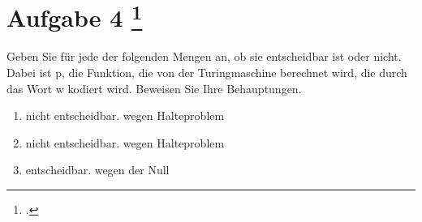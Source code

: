 \documentclass{lehramt-informatik-aufgabe}
\begin{document}
\liAufgabenTitel{}
\section{Aufgabe 4
\footcite{examen:66115:2020:09}}

Geben Sie für jede der folgenden Mengen an, ob sie entscheidbar ist oder
nicht. Dabei ist p, die Funktion, die von der Turingmaschine berechnet
wird, die durch das Wort w kodiert wird. Beweisen Sie Ihre Behauptungen.

\begin{enumerate}

\item {}

\begin{liAntwort}
nicht entscheidbar. wegen Halteproblem
\end{liAntwort}


\item {}

\begin{liAntwort}
nicht entscheidbar. wegen Halteproblem
\end{liAntwort}


\item {}

\begin{liAntwort}
entscheidbar. wegen der Null
\end{liAntwort}

\end{enumerate}
\end{document}

